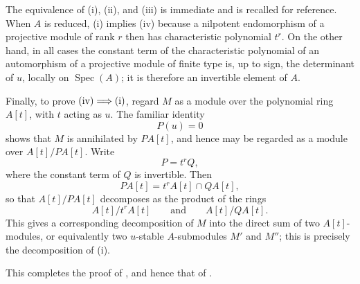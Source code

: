 The equivalence of \textup{(i)}, \textup{(ii)}, and \textup{(iii)}
is immediate and is recalled for reference. When \(A\) is reduced,
\textup{(i)} implies \textup{(iv)} because a nilpotent
endomorphism of a projective module of rank \(r\) then has
characteristic polynomial \(t^r\). On the other hand, in all cases
the constant term of the characteristic polynomial of an
automorphism of a projective module of finite type is, up to sign,
the determinant of \(u\), locally on \(\operatorname{Spec}(A)\);
it is therefore an invertible element of \(A\).

Finally, to prove
\(\textup{(iv)}\Longrightarrow\textup{(i)}\), regard \(M\) as a
module over the polynomial ring \(A[t]\), with \(t\) acting as
\(u\). The familiar identity
\[
  P(u)=0
\]
shows that \(M\) is annihilated by \(P A[t]\), and hence may be
regarded as a module over \(A[t]/P A[t]\). Write
\[
  P=t^rQ,
\]
where the constant term of \(Q\) is invertible. Then
\[
  P A[t]=t^rA[t]\cap Q A[t],
\]
so that \(A[t]/P A[t]\) decomposes as the product of the rings
\[
  A[t]/t^rA[t]
  \qquad\text{and}\qquad
  A[t]/Q A[t].
\]
This gives a corresponding decomposition of \(M\) into the direct
sum of two \(A[t]\)-modules, or equivalently two \(u\)-stable
\(A\)-submodules \(M'\) and \(M''\); this is precisely the
decomposition of \textup{(i)}.

This completes the proof of , and hence that of .
